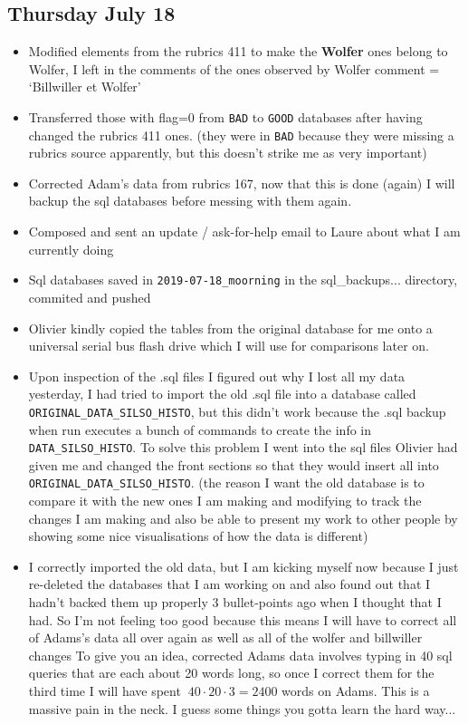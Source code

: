 \documentclass[12pt]{article}
\begin{document}
\subsection{Thursday July 18}
\begin{itemize}
    \item Modified elements from the rubrics 411 to make the \textbf{Wolfer} ones belong to Wolfer, I left in the comments of the ones observed by Wolfer comment = `Billwiller et Wolfer'
    \item Transferred those with flag=0 from \texttt{BAD} to \texttt{GOOD} databases after having changed the rubrics 411 ones. (they were in \texttt{BAD} because they were missing a rubrics source apparently, but this doesn't strike me as very important)
    \item Corrected Adam's data from rubrics 167, now that this is done (again) I will backup the sql databases before messing with them again.
    \item Composed and sent an update / ask-for-help email to Laure about what I am currently doing
    \item Sql databases saved in \texttt{2019-07-18\_moorning} in the sql\_backups... directory, commited and pushed
    \item Olivier kindly copied the tables from the original database for me onto a universal serial bus flash drive which I will use for comparisons later on.
    \item Upon inspection of the .sql files I figured out why I lost all my data yesterday, I had tried to import the old .sql file into a database called \texttt{ORIGINAL\_DATA\_SILSO\_HISTO}, but this didn't work because the .sql backup when run executes a bunch of commands to create the info in \texttt{DATA\_SILSO\_HISTO}. To solve this problem I went into the sql files Olivier had given me and changed the front sections so that they would insert all into \texttt{ORIGINAL\_DATA\_SILSO\_HISTO}. (the reason I want the old database is to compare it with the new ones I am making and modifying to track the changes I am making and also be able to present my work to other people by showing some nice visualisations of how the data is different)
    \item I correctly imported the old data, but I am kicking myself now because I just re-deleted the databases that I am working on and also found out that I hadn't backed them up properly 3 bullet-points ago when I thought that I had. So I'm not feeling too good because this means I will have to correct all of Adams's data all over again as well as all of the wolfer and billwiller changes To give you an idea, corrected Adams data involves typing in 40 sql queries that are each about 20 words long, so once I correct them for the third time I will have spent $~40\cdot20\cdot3=2400$ words on Adams. This is a massive pain in the neck. I guess some things you gotta learn the hard way...

\end{itemize}
\end{document}
